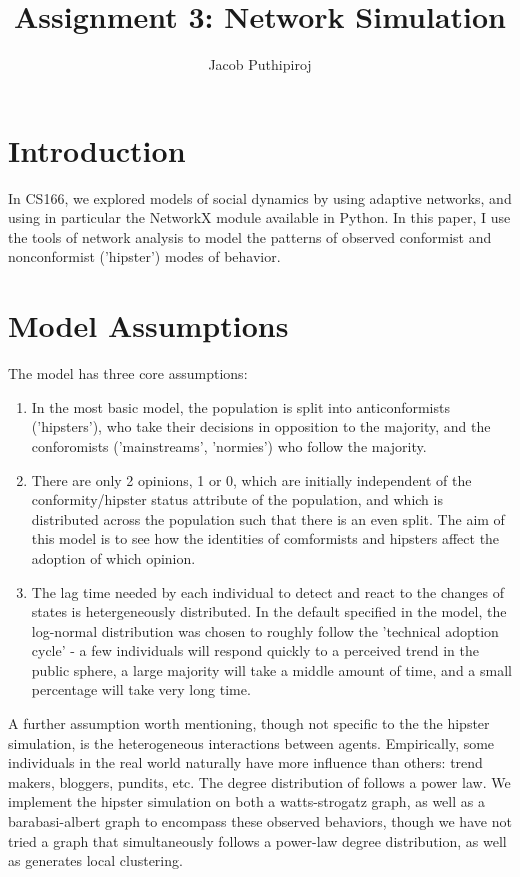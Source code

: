 \documentclass{article}
\begin{document}
\title{Assignment 3: Network Simulation}
\author{Jacob Puthipiroj}
\maketitle

\makeatletter
\newcommand{\mybox}{%
    \collectbox{%
        \setlength{\fboxsep}{1pt}%
        \fbox{\BOXCONTENT}%
    }%
}


\section*{Introduction}
In CS166, we explored models of social dynamics by using adaptive networks, and using in particular the NetworkX module available in Python. In this paper, I use the tools of network analysis to model the patterns of observed conformist and nonconformist ('hipster') modes of behavior. 

\section*{Model Assumptions}
The model has three core assumptions:
\begin{enumerate}
\item In the most basic model, the population is split into anticonformists ('hipsters'), who take their decisions in opposition to the majority, and the conforomists ('mainstreams', 'normies') who follow the majority.  
\item There are only 2 opinions, 1 or 0, which are initially independent of the conformity/hipster status attribute of the population, and which is distributed across the population such that there is an even split. The aim of this model is to see how the identities of comformists and hipsters affect the adoption of which opinion. 
\item The lag time needed by each individual to detect and react to the changes of states is hetergeneously distributed. In the default specified in the model, the log-normal distribution was chosen to roughly follow the 'technical adoption cycle' - a few individuals will respond quickly to a perceived trend in the public sphere, a large majority will take a middle amount of time, and a small percentage will take very long time. 
\end{enumerate}
A further assumption worth mentioning, though not specific to the the hipster simulation, is the heterogeneous interactions between agents. Empirically, some individuals in the real world naturally have more influence than others: trend makers, bloggers, pundits, etc. The degree distribution of follows a power law. We implement the hipster simulation on both a watts-strogatz graph, as well as a barabasi-albert graph to encompass these observed behaviors, though we have not tried a graph that simultaneously follows a power-law degree distribution, as well as generates local clustering.\\
\end{document}
